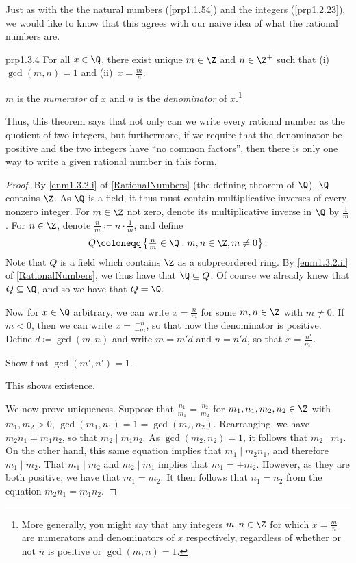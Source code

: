 Just as with the the natural numbers (\cref{prp1.1.54}) and the integers (\cref{prp1.2.23}), we would like to know that this agrees with our naive idea of what the rational numbers are.
\begin{prp}{}{prp1.3.4}
For all $x\in \Q$, there exist unique $m\in \Z$ and $n\in \Z^+$ such that (i)~$\gcd (m,n)=1$ and (ii)~$x=\frac{m}{n}$.
\begin{rmk}
$m$ is the \emph{numerator} of $x$ and $n$ is the \emph{denominator} of $x$.\footnote{More generally, you might say that any integers $m,n\in \Z$ for which $x=\frac{m}{n}$ are numerators and denominators of $x$ respectively, regardless of whether or not $n$ is positive or $\gcd (m,n)=1$.}
\end{rmk}
\begin{rmk}
Thus, this theorem says that not only can we write every rational number as the quotient of two integers, but furthermore, if we require that the denominator be positive and the two integers have ``no common factors'', then there is only one way to write a given rational number in this form.
\end{rmk}
\begin{proof}
By \cref{enm1.3.2.i} of \cref{RationalNumbers} (the defining theorem of $\Q$), $\Q$ contains $\Z$.  As $\Q$ is a field, it thus must contain multiplicative inverses of every nonzero integer.  For $m\in \Z$ not zero, denote its multiplicative inverse in $\Q$ by $\frac{1}{m}$.  For $n\in \Z$, denote $\frac{n}{m}\coloneqq n\cdot \frac{1}{m}$, and define
\begin{equation}
Q\coloneqq \left\{ \tfrac{n}{m}\in \Q :m,n\in \Z ,m\neq 0\right\} .
\end{equation}
Note that $Q$ is a field which contains $\Z$ as a subpreordered ring.  By \cref{enm1.3.2.ii} of \cref{RationalNumbers}, we thus have that $\Q \subseteq Q$.  Of course we already knew that $Q\subseteq \Q$, and so we have that $Q=\Q$.

Now for $x\in \Q$ arbitrary, we can write $x=\frac{n}{m}$ for some $m,n\in \Z$ with $m\neq 0$.  If $m<0$, then we can write $x=\frac{-n}{-m}$, so that now the denominator is positive.  Define $d\coloneqq \gcd (m,n)$ and write $m=m'd$ and $n=n'd$, so that $x=\frac{n'}{m'}$.
\begin{exr}{}{}
Show that $\gcd (m',n')=1$.
\end{exr}
This shows existence.

We now prove uniqueness.  Suppose that $\frac{n_1}{m_1}=\frac{n_2}{m_2}$ for $m_1,n_1,m_2,n_2\in \Z$ with $m_1,m_2>0$, $\gcd (m_1,n_1)=1=\gcd (m_2,n_2)$.  Rearranging, we have $m_2n_1=m_1n_2$, so that $m_2\mid m_1n_2$.  As $\gcd (m_2,n_2)=1$, it follows that $m_2\mid m_1$.  On the other hand, this same equation implies that $m_1\mid m_2n_1$, and therefore $m_1\mid m_2$.  That $m_1\mid m_2$ and $m_2\mid m_1$ implies that $m_1=\pm m_2$.  However, as they are both positive, we have that $m_1=m_2$.  It then follows that $n_1=n_2$ from the equation $m_2n_1=m_1n_2$.
\end{proof}
\end{prp}
